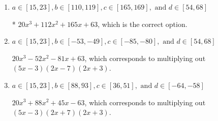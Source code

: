 \documentclass{extbook}[14pt]
\begin{document}
\begin{enumerate}
{\begin{enumerate}[label=\Alph*.]
$20x^{3} -112 x^{2} +165 x -63$, which corresponds to multiplying out $(5x -3)(2x -7)(2x -3)$.
\item \( a \in [15, 23], b \in [110, 119], c \in [165, 169], \text{ and } d \in [54, 68] \)

* $20x^{3} +112 x^{2} +165 x + 63$, which is the correct option.
\item \( a \in [15, 23], b \in [-53, -49], c \in [-85, -80], \text{ and } d \in [54, 68] \)

$20x^{3} -52 x^{2} -81 x + 63$, which corresponds to multiplying out $(5x -3)(2x -7)(2x + 3)$.
\item \( a \in [15, 23], b \in [88, 93], c \in [36, 51], \text{ and } d \in [-64, -58] \)

$20x^{3} +88 x^{2} +45 x -63$, which corresponds to multiplying out $(5x -3)(2x + 7)(2x + 3)$.
\end{enumerate}

}
\end{enumerate}
\end{document}
